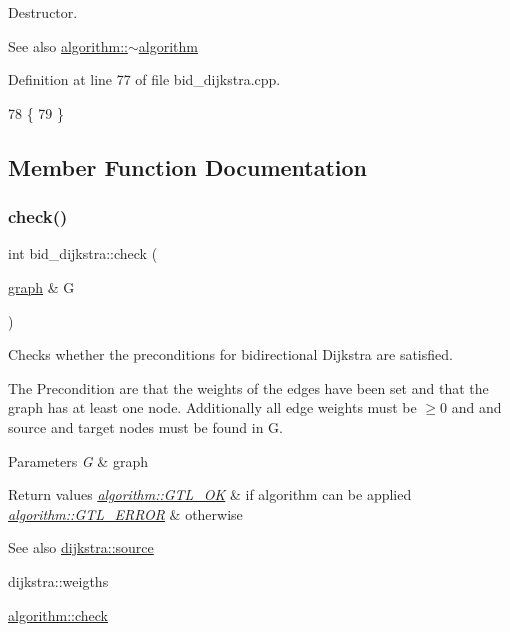 Destructor. 

\begin{DoxySeeAlso}{See also}
\mbox{\hyperlink{classalgorithm_adca9b1e7fa3afd914519a9dbb44e9fd5}{algorithm\+::$\sim$algorithm}} 
\end{DoxySeeAlso}


Definition at line 77 of file bid\+\_\+dijkstra.\+cpp.


\begin{DoxyCode}
78 \{
79 \}
\end{DoxyCode}


\subsection{Member Function Documentation}
\mbox{\label{classbid__dijkstra_a504aa04d114f27f2f886ee3b025ad95b}} 
\subsubsection{\texorpdfstring{check()}{check()}}
{\footnotesize\ttfamily int bid\+\_\+dijkstra\+::check (\begin{DoxyParamCaption}\item[{\mbox{\hyperlink{classgraph}{graph}} \&}]{G }\end{DoxyParamCaption})\hspace{0.3cm}{\ttfamily [virtual]}}



Checks whether the preconditions for bidirectional Dijkstra are satisfied. 

The Precondition are that the weights of the edges have been set and that the graph has at least one node. Additionally all edge weights must be $\ge 0$ and and source and target nodes must be found in {\ttfamily G}.


\begin{DoxyParams}{Parameters}
{\em G} & graph\\
\hline
\end{DoxyParams}

\begin{DoxyRetVals}{Return values}
{\em \mbox{\hyperlink{classalgorithm_af1a0078e153aa99c24f9bdf0d97f6710a5114c20e4a96a76b5de9f28bf15e282b}{algorithm\+::\+G\+T\+L\+\_\+\+OK}}} & if algorithm can be applied \\
\hline
{\em \mbox{\hyperlink{classalgorithm_af1a0078e153aa99c24f9bdf0d97f6710a6fcf574690bbd6cf710837a169510dd7}{algorithm\+::\+G\+T\+L\+\_\+\+E\+R\+R\+OR}}} & otherwise\\
\hline
\end{DoxyRetVals}
\begin{DoxySeeAlso}{See also}
\mbox{\hyperlink{classdijkstra_a9689f2628f76ddb3747ea18c91bd7041}{dijkstra\+::source}} 

dijkstra\+::weigths 

\mbox{\hyperlink{classalgorithm_a76361fb03ad1cf643affc51821e43bed}{algorithm\+::check}} 
\end{DoxySeeAlso}



